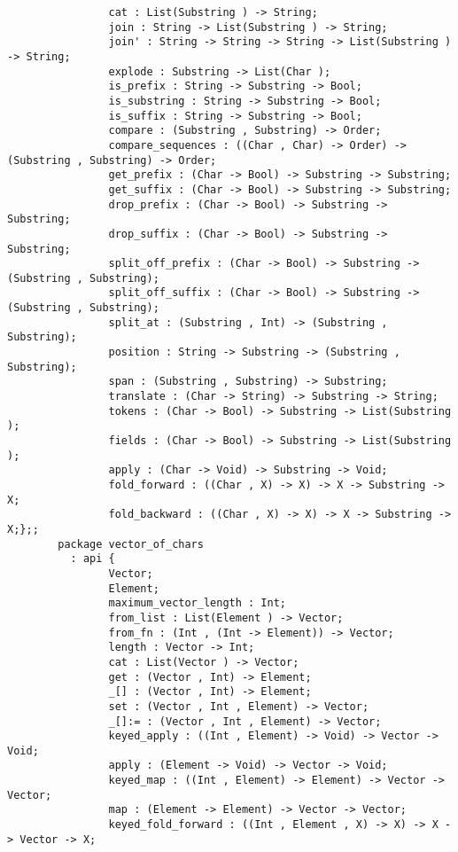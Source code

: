 \begin{verbatim}
                cat : List(Substring ) -> String;
                join : String -> List(Substring ) -> String;
                join' : String -> String -> String -> List(Substring ) -> String;
                explode : Substring -> List(Char );
                is_prefix : String -> Substring -> Bool;
                is_substring : String -> Substring -> Bool;
                is_suffix : String -> Substring -> Bool;
                compare : (Substring , Substring) -> Order;
                compare_sequences : ((Char , Char) -> Order) -> (Substring , Substring) -> Order;
                get_prefix : (Char -> Bool) -> Substring -> Substring;
                get_suffix : (Char -> Bool) -> Substring -> Substring;
                drop_prefix : (Char -> Bool) -> Substring -> Substring;
                drop_suffix : (Char -> Bool) -> Substring -> Substring;
                split_off_prefix : (Char -> Bool) -> Substring -> (Substring , Substring);
                split_off_suffix : (Char -> Bool) -> Substring -> (Substring , Substring);
                split_at : (Substring , Int) -> (Substring , Substring);
                position : String -> Substring -> (Substring , Substring);
                span : (Substring , Substring) -> Substring;
                translate : (Char -> String) -> Substring -> String;
                tokens : (Char -> Bool) -> Substring -> List(Substring );
                fields : (Char -> Bool) -> Substring -> List(Substring );
                apply : (Char -> Void) -> Substring -> Void;
                fold_forward : ((Char , X) -> X) -> X -> Substring -> X;
                fold_backward : ((Char , X) -> X) -> X -> Substring -> X;};;
        package vector_of_chars
          : api {
                Vector;
                Element;
                maximum_vector_length : Int;
                from_list : List(Element ) -> Vector;
                from_fn : (Int , (Int -> Element)) -> Vector;
                length : Vector -> Int;
                cat : List(Vector ) -> Vector;
                get : (Vector , Int) -> Element;
                _[] : (Vector , Int) -> Element;
                set : (Vector , Int , Element) -> Vector;
                _[]:= : (Vector , Int , Element) -> Vector;
                keyed_apply : ((Int , Element) -> Void) -> Vector -> Void;
                apply : (Element -> Void) -> Vector -> Void;
                keyed_map : ((Int , Element) -> Element) -> Vector -> Vector;
                map : (Element -> Element) -> Vector -> Vector;
                keyed_fold_forward : ((Int , Element , X) -> X) -> X -> Vector -> X;

\end{verbatim}
